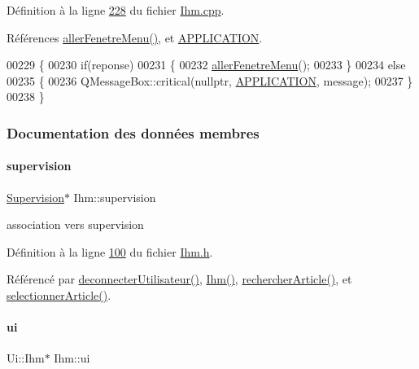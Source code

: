 Définition à la ligne \hyperlink{_ihm_8cpp_source_l00228}{228} du fichier \hyperlink{_ihm_8cpp_source}{Ihm.\+cpp}.



Références \hyperlink{_ihm_8cpp_source_l00190}{aller\+Fenetre\+Menu()}, et \hyperlink{_ihm_8h_source_l00031}{A\+P\+P\+L\+I\+C\+A\+T\+I\+ON}.


\begin{DoxyCode}
00229 \{
00230     \textcolor{keywordflow}{if}(reponse)
00231     \{
00232         \hyperlink{class_ihm_ad158f31ff15add856dfae37a5f40da27}{allerFenetreMenu}();
00233     \}
00234     \textcolor{keywordflow}{else}
00235     \{
00236         QMessageBox::critical(\textcolor{keyword}{nullptr}, \hyperlink{_ihm_8h_a796bd7c6ba2e59281760fb155c6287e8}{APPLICATION}, message);
00237     \}
00238 \}
\end{DoxyCode}


\subsubsection{Documentation des données membres}
\mbox{\label{class_ihm_a454ab89ced1b27fcb42d550e443e780c}} 
\paragraph{\texorpdfstring{supervision}{supervision}}
{\footnotesize\ttfamily \hyperlink{class_supervision}{Supervision}$\ast$ Ihm\+::supervision\hspace{0.3cm}{\ttfamily [private]}}



association vers supervision 



Définition à la ligne \hyperlink{_ihm_8h_source_l00100}{100} du fichier \hyperlink{_ihm_8h_source}{Ihm.\+h}.



Référencé par \hyperlink{_ihm_8cpp_source_l00159}{deconnecter\+Utilisateur()}, \hyperlink{_ihm_8cpp_source_l00029}{Ihm()}, \hyperlink{_ihm_8cpp_source_l00256}{rechercher\+Article()}, et \hyperlink{_ihm_8cpp_source_l00291}{selectionner\+Article()}.

\mbox{\label{class_ihm_a0ac5f47856566ceeeca1720109bf70ea}} 
\paragraph{\texorpdfstring{ui}{ui}}
{\footnotesize\ttfamily Ui\+::\+Ihm$\ast$ Ihm\+::ui\hspace{0.3cm}{\ttfamily [private]}}



